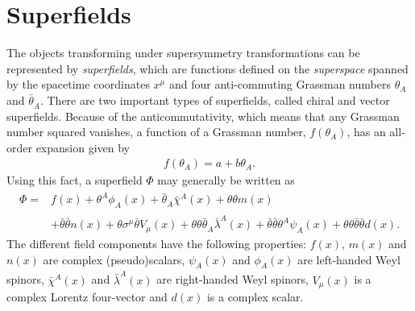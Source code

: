 \documentclass[twoside,english]{uiofysmaster}
\begin{document}
\section{Superfields}
The objects transforming under supersymmetry transformations can be represented by {\it superfields}, which are functions defined on the {\it superspace} spanned by the spacetime coordinates $x^\mu$ and four anti-commuting Grassman numbers $\theta_A$ and $\bar\theta_{\dot A}$.  There are two important types of superfields, called chiral and vector superfields. Because of the anticommutativity, which means that any Grassman number squared vanishes, a function of a Grassman number, $f(\theta_A)$, has an all-order expansion given by
\begin{align}
	f(\theta_A) = a + b\theta_A.
\end{align}
Using this fact, a superfield $\Phi$ may generally be written as
\begin{align}
	\Phi = &f(x) + \theta^A\phi_A(x) + \bar\theta_{\dot A}\bar\chi^{\dot A}(x) + \theta \theta m(x)\\
	 &+ \bar\theta \bar\theta n(x) + \theta\sigma^\mu \bar\theta V_\mu(x) + \theta\theta\bar\theta_{\dot A}\bar\lambda^{\dot A}(x) + \bar\theta \bar\theta \theta^A \psi_A(x) + \theta \theta \bar\theta \bar\theta d(x).\nonumber
\end{align}
The different field components have the following properties: $f(x)$, $m(x)$ and $n(x)$ are complex (pseudo)scalars, $\psi_A(x)$ and $\phi_A(x)$ are left-handed Weyl spinors, $\bar\chi^{\dot A}(x)$ and $\bar\lambda^{\dot A}(x)$ are right-handed Weyl spinors, $V_\mu (x)$ is a complex Lorentz four-vector and $d(x)$ is a complex scalar.
\end{document}
